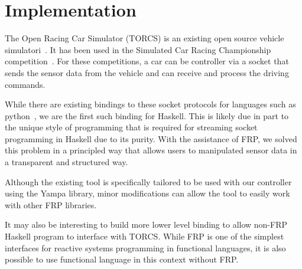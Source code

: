 \section{Implementation}

The Open Racing Car Simulator (TORCS) is an existing open source vehicle simulatori~\cite{torcs}.
It has been used in the Simulated Car Racing Championship competition~\cite{SCRC}.
For these competitions, a car can be controller via a socket that sends the sensor data from the vehicle and can receive and process the driving commands.

While there are existing bindings to these socket protocols for languages such as python~\cite{snakeoil,pyscrc}, we are the first such binding for Haskell.
This is likely due in part to the unique style of programming that is required for streaming socket programming in Haskell due to its purity.
With the assistance of FRP, we solved this problem in a principled way that allows users to manipulated sensor data in a transparent and structured way.


Although the existing tool is specifically tailored to be used with our controller using the Yampa library,
  minor modifications can allow the tool to easily work with other FRP libraries.

It may also be interesting to build more lower level binding to allow non-FRP Haskell program to interface with TORCS.
While FRP is one of the simplest interfaces for reactive systems programming in functional languages, it is also possible to use functional language in this context without FRP.

